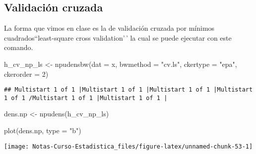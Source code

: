 \documentclass[
  12pt,
]{book}
\newenvironment{Shaded}{\begin{snugshade}}{\end{snugshade}}
\newcommand{\AttributeTok}[1]{\textcolor[rgb]{0.77,0.63,0.00}{#1}}
\newcommand{\DecValTok}[1]{\textcolor[rgb]{0.00,0.00,0.81}{#1}}
\newcommand{\FunctionTok}[1]{\textcolor[rgb]{0.00,0.00,0.00}{#1}}
\newcommand{\NormalTok}[1]{#1}
\newcommand{\OtherTok}[1]{\textcolor[rgb]{0.56,0.35,0.01}{#1}}
\newcommand{\StringTok}[1]{\textcolor[rgb]{0.31,0.60,0.02}{#1}}
\theoremstyle{definition}
\theoremstyle{definition}
\theoremstyle{definition}
\theoremstyle{definition}
\theoremstyle{remark}
\begin{document}
\hypertarget{validaciuxf3n-cruzada-1}{%
\subsection{Validación cruzada}\label{validaciuxf3n-cruzada-1}}

La forma que vimos en clase es la de validación cruzada por mínimos
cuadrados``least-square cross validation'\,' la cual se puede ejecutar
con este comando.

\begin{Shaded}
\begin{Highlighting}[]
\NormalTok{h\_cv\_np\_ls }\OtherTok{\textless{}{-}} \FunctionTok{npudensbw}\NormalTok{(}\AttributeTok{dat =}\NormalTok{ x, }\AttributeTok{bwmethod =} \StringTok{"cv.ls"}\NormalTok{,}
    \AttributeTok{ckertype =} \StringTok{"epa"}\NormalTok{, }\AttributeTok{ckerorder =} \DecValTok{2}\NormalTok{)}
\end{Highlighting}
\end{Shaded}

\begin{verbatim}
## Multistart 1 of 1 |Multistart 1 of 1 |Multistart 1 of 1 |Multistart 1 of 1 /Multistart 1 of 1 |Multistart 1 of 1 |                   
\end{verbatim}

\begin{Shaded}
\begin{Highlighting}[]
\NormalTok{dens.np }\OtherTok{\textless{}{-}} \FunctionTok{npudens}\NormalTok{(h\_cv\_np\_ls)}

\FunctionTok{plot}\NormalTok{(dens.np, }\AttributeTok{type =} \StringTok{"b"}\NormalTok{)}
\end{Highlighting}
\end{Shaded}

\begin{center}\texttt{[image: Notas-Curso-Estadistica\_files/figure-latex/unnamed-chunk-53-1]} \end{center}
\end{document}
